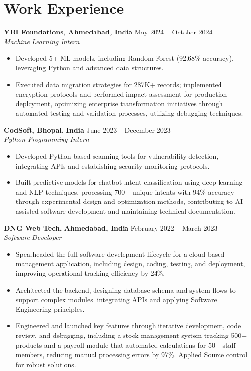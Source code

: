 \documentclass[a4paper,10pt]{article}
\begin{document}
\section*{Work Experience}
\textbf{YBI Foundations, Ahmedabad, India} \hfill May 2024 -- October 2024\\
\textit{Machine Learning Intern} \\
\begin{itemize}[leftmargin=*, itemsep=0pt, parsep=1pt]
\vspace{-6mm}
\item Developed 5+ ML models, including Random Forest (92.68\% accuracy), leveraging Python and advanced data structures.
\item Executed data migration strategies for 287K+ records; implemented encryption protocols and performed impact assessment for production deployment, optimizing enterprise transformation initiatives through automated testing and validation processes, utilizing debugging techniques.
\end{itemize}
\textbf{CodSoft, Bhopal, India} \hfill June 2023 -- December 2023\\
\textit{Python Programming Intern} \\
\begin{itemize}[leftmargin=*, itemsep=0pt, parsep=1pt]
\vspace{-6mm}
\item Developed Python-based scanning tools for vulnerability detection, integrating APIs and establishing security monitoring protocols.
\item Built predictive models for chatbot intent classification using deep learning and NLP techniques, processing 700+ unique intents with 94\% accuracy through experimental design and optimization methods, contributing to AI-assisted software development and maintaining technical documentation.
\vspace{-1mm}
\end{itemize}

\textbf{DNG Web Tech, Ahmedabad, India} \hfill February 2022 -- March 2023 \\
\textit{Software Developer} \\

\begin{itemize}[leftmargin=*, itemsep=0pt, parsep=1pt] %
\vspace{-7mm}
    \item Spearheaded the full software development lifecycle for a cloud-based management application, including design, coding, testing, and deployment, improving operational tracking efficiency by 24\%.
    \item Architected the backend, designing database schema and system flows to support complex modules, integrating APIs and applying Software Engineering principles.
    \item Engineered and launched key features through iterative development, code review, and debugging, including a stock management system tracking 500+ products and a payroll module that automated calculations for 50+ staff members, reducing manual processing errors by 97\%. Applied Source control for robust solutions.
\end{itemize}
\end{document}
